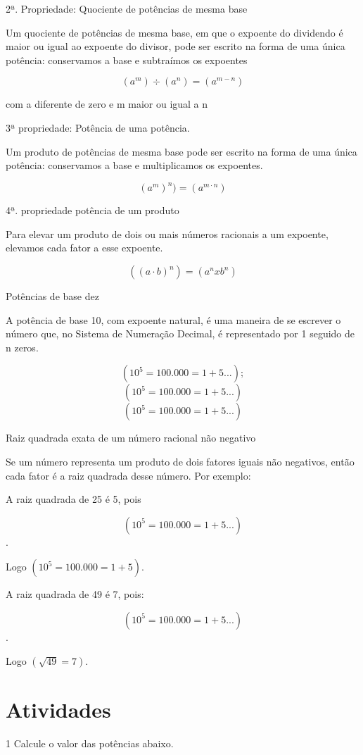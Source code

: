 2ª. Propriedade: Quociente de potências de mesma base

Um quociente de potências de mesma base, em que o expoente do dividendo
é maior ou igual ao expoente do divisor, pode ser escrito na forma de
uma única potência: conservamos a base e subtraímos os expoentes

$$(a^m) \div (a^n) = (a^{m-n})$$ 

com a diferente de zero e m maior ou
igual a n

3ª propriedade: Potência de uma potência.

Um produto de potências de mesma base pode ser escrito na forma de uma
única potência: conservamos a base e multiplicamos os expoentes.

$$(a^m)^n) = (a^{m \cdot n})$$

4ª. propriedade potência de um produto

Para elevar um produto de dois ou mais números racionais a um expoente,
elevamos cada fator a esse expoente.

$$((a \cdot b)^n)= (a^n x b^n)$$

Potências de base dez

A potência de base 10, com expoente natural, é uma maneira de se
escrever o número que, no Sistema de Numeração Decimal, é representado
por 1 seguido de n zeros.

$$(10^5 = 100.000 = 1 + 5...);$$
$$(10^5 = 100.000 = 1 + 5...)$$
$$(10^5 = 100.000 = 1 + 5...)$$

Raiz quadrada exata de um número racional não negativo

Se um número representa um produto de dois fatores iguais não negativos,
então cada fator é a raiz quadrada desse número. Por exemplo:

A raiz quadrada de 25 é 5, pois 

$$(10^5 = 100.000 = 1 + 5...)$$. 

Logo $(10^5 = 100.000 = 1 + 5)$.

A raiz quadrada de 49 é 7, pois:

 $$(10^5 = 100.000 = 1 + 5...)$$. 

 Logo $(\sqrt{49} = 7)$.



\section{Atividades}

\num{1} Calcule o valor das potências abaixo.


